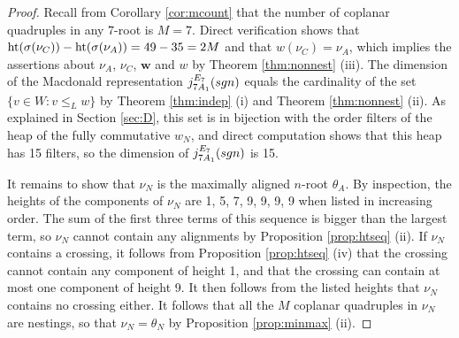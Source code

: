 \documentclass[11pt]{amsart}
\theoremstyle{plain}
\theoremstyle{definition}
\theoremstyle{remark}
\numberwithin{equation}{subsection}
\newcommand{\al}{\alpha}
\newcommand{\bfw}{\mathbf{w}}
\newcommand{\coplanar}{coplanar\xspace}
\newcommand{\rootht}{\text{\rm ht}}
\newcommand{\macd}[2]{j^{#1}_{#2}({\rm{sgn}})}
\begin{document}
\begin{proof}
Recall from Corollary \ref{cor:mcount} that the number of \coplanar quadruples
in any $7$-root is $M=7$.  Direct verification shows that
$\rootht(\sigma(\nu_C)) - \rootht(\sigma(\nu_A))=49-35 = 2M$ and that
$w(\nu_C)=\nu_A$, which implies the assertions about $\nu_A$, $\nu_C$,
$\bfw$ and  $w$ by Theorem \ref{thm:nonnest} (iii). The dimension of the
Macdonald representation $\macd{E_7}{7A_1}$ equals the cardinality of the set
$\{v\in W: v\le_L w\}$ by Theorem \ref{thm:indep} (i) and Theorem
\ref{thm:nonnest} (ii). As explained in Section \ref{sec:D}, this set is in
bijection with the order filters of the heap of the fully commutative $w_N$, and
direct computation shows that this heap has 15 filters, so the dimension of
$\macd{E_7}{7A_1}$ is 15.


It remains to show that $\nu_N$ is the maximally aligned $n$-root $\theta_A$.
By inspection, the heights of the components of $\nu_N$ are 1, 5, 7, 9, 9, 9, 9
when listed in increasing order. The sum of the first three terms of this
sequence is bigger than the largest term, so $\nu_N$ cannot contain any
alignments by Proposition \ref{prop:htseq} (ii).  If $\nu_N$ contains a
crossing, it follows from Proposition \ref{prop:htseq} (iv) that the crossing
cannot contain any component of height 1, and that the crossing can contain at
most one component of height 9. It then follows from the listed heights that
$\nu_N$ contains no crossing either.  It follows that all the $M$ coplanar
quadruples in $\nu_N$ are nestings, so that $\nu_N=\theta_N$ by Proposition
\ref{prop:minmax} (ii).
\end{proof}
\end{document}
